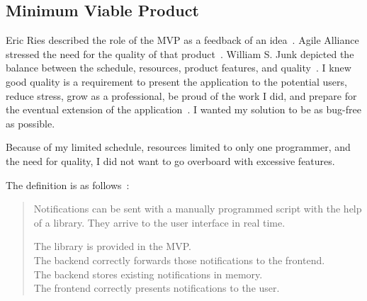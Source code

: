 \subsection{Minimum Viable Product}\label{sec:minimum-viable-product}

Eric Ries described the role of the MVP
as a feedback of an idea~\cite{ries_lean_2011}.
Agile Alliance stressed the need
for the quality of that product~\cite{foster_mvp_2022}.
William S. Junk depicted the balance between
the schedule,
resources,
product features,
and quality~\cite{junk_dynamic_2000}.
I knew good quality is a requirement
to present the application to the potential users,
reduce stress,
grow as a professional,
be proud of the work I did,
and prepare for the eventual extension
of the application~\cite{beck_extreme_2004,foster_mvp_2022,martin_clean_2011}.
I wanted my solution to be
as bug-free as possible.

Because of my limited schedule,
resources limited to only one programmer,
and the need for quality,
I did not want to go overboard
with excessive features.

The definition is as follows~\cite{sewera_mvp_2022}:

\begin{quote}
  Notifications can be sent with a manually programmed script
  with the help of a library.
  They arrive to the user interface in real time.

  The library is provided in the MVP.\\
  The backend correctly forwards those notifications to the frontend.\\
  The backend stores existing notifications in memory.\\
  The frontend correctly presents notifications to the user.
\end{quote}
